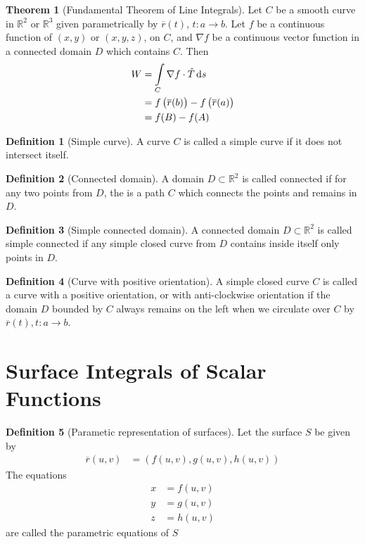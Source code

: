 \documentclass[fleqn, a4paper, 12pt, twoside]{article}
\theoremstyle{definition}
\newtheorem{definition}{Definition}
\theoremstyle{theorem}
\newtheorem{theorem}{Theorem}
\begin{document}
{\begin{theorem}[Fundamental Theorem of Line Integrals]
	Let $C$ be a smooth curve in $\mathbb{R}^2$ or $\mathbb{R}^3$ given parametrically by $\overline{r}(t)$, $t : a \to b$.
	Let $f$ be a continuous function of $(x,y)$ or $(x,y,z)$, on $C$, and $\nabla f$ be a continuous vector function in a connected domain $D$ which contains $C$.
	Then
	\begin{align*}
		W & = \int\limits_{C} \nabla f \cdot \hat{T} \dif s                     \\
                  & = f\left( \overline{r}(b) \right) - f\left( \overline{r}(a) \right) \\
                  & = f(B) - f(A)
	\end{align*}
	\label{Fundamental_Theorem_of_Line_Integrals}
\end{theorem}

\begin{definition}[Simple curve]
	A curve $C$ is called a simple curve if it does not intersect itself.
\end{definition}

\begin{definition}[Connected domain]
	A domain $D \subset \mathbb{R}^2$ is called connected if for any two points from $D$, the is a path $C$ which connects the points and remains in $D$.
\end{definition}

\begin{definition}[Simple connected domain]
	A connected domain $D \subset \mathbb{R}^2$ is called simple connected if any simple closed curve from $D$ contains inside itself only points in $D$.
\end{definition}

\begin{definition}[Curve with positive orientation]
	A simple closed curve $C$ is called a curve with a positive orientation, or with anti-clockwise orientation if the domain $D$ bounded by $C$ always remains on the left when we circulate over $C$ by $\overline{r}(t), t : a \to b$.
\end{definition}

\section{Surface Integrals of Scalar Functions}

\begin{definition}[Parametic representation of surfaces]
	Let the surface $S$ be given by
	\begin{align*}
		\overline{r}(u,v) & = \left( f(u,v) , g(u,v) , h(u,v) \right)
	\end{align*}
	The equations
	\begin{align*}
		x & = f(u,v) \\
		y & = g(u,v) \\
		z & = h(u,v)
	\end{align*}
	are called the parametric equations of $S$
\end{definition}

}
\end{document}
